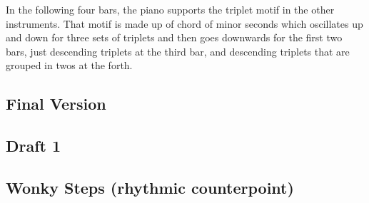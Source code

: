 \documentclass{article}
\newcommand\emptypage{
    \null
    \thispagestyle{empty}
    \newpage
    }
\begin{document}
In the following four bars, the piano supports the triplet motif in the other
instruments.  That motif is made up of chord of minor seconds which oscillates
up and down for three sets of triplets and then goes downwards for the first
two bars, just descending triplets at the third bar, and descending triplets
that are grouped in twos at the forth.\\

\newpage
\begin{center}
\vspace*{\fill}
\LARGE
\subsection{Final Version}
\vspace*{\fill}
%
\end{center}

\newpage
\begin{center}
\vspace*{\fill}
\LARGE
\subsection{Draft 1}
\vspace*{\fill}
%
\end{center}
\newpage
\emptypage
\emptypage
\emptypage
\emptypage
\emptypage
\emptypage
\emptypage
\emptypage
\emptypage
\emptypage
\emptypage
\emptypage

\begin{center}
\vspace*{\fill}
\LARGE
    \section{Wonky Steps (rhythmic counterpoint)}
\vspace*{\fill}
%
\end{center}

\newpage
\end{document}
